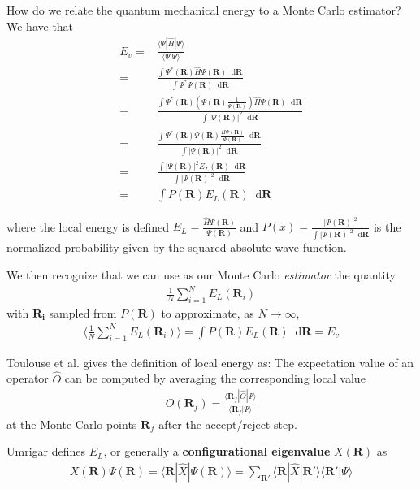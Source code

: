 \documentclass[twoside,english]{uiofysmaster}
\newcommand*\dif{\mathop{}\!\mathrm{d}}
\begin{document}
How do we relate the quantum mechanical energy to a Monte Carlo estimator? We have that \cite{Toulouse2016}
\begin{align}
	E_v =& \frac{\langle \Psi | \hat{H} | \Psi \rangle}{\langle \Psi | \Psi \rangle}  \\
	=& \frac{ \int \Psi^\ast (\bm{R}) \hat{H} \Psi(\bm{R}) \dif \bm{R} }
	{\int \Psi^\ast \Psi(\bm{R}) \dif \bm{R}} \\
	=& \frac{ \int \Psi^\ast (\bm{R}) (\Psi(\bm{R}) \frac{1}{\Psi(\bm{R})}) \hat{H} \Psi(\bm{R}) \dif \bm{R} }
	{\int | \Psi(\bm{R})|^2 \dif \bm{R}} \\
	=&  \frac{ \int \Psi^\ast (\bm{R}) \Psi(\bm{R}) \frac{\hat{H} \Psi(\bm{R}) }{\Psi(\bm{R})}  \dif \bm{R} }
	{\int | \Psi(\bm{R})|^2 \dif \bm{R}} \\
	=&  \frac{ \int | \Psi(\bm{R})|^2  E_L(\bm{R})  \dif \bm{R} }
	{\int | \Psi(\bm{R})|^2 \dif \bm{R}} \\
	=& \int P(\bm{R}) E_L (\bm{R}) \dif \bm{R}
\end{align}

where the local energy is defined $E_L = \frac{\hat{H} \Psi(\bm{R}) }{\Psi(\bm{R})} $ and $P(x) = \frac{| \Psi(\bm{R})|^2 }{ \int | \Psi(\bm{R})|^2 \dif \bm{R} }$ is the normalized probability given by the squared absolute wave function. 

We then recognize that we can use as our Monte Carlo \textit{estimator} the quantity
\begin{align}
	\frac{1}{N} \sum_{i=1}^N E_L(\bm{R}_i)
\end{align}
with $\bm{R_i}$ sampled from $P(\bm{R})$ to approximate, as $N \rightarrow \infty$, 
\begin{align}
	\langle \frac{1}{N} \sum_{i=1}^N E_L(\bm{R}_i) \rangle = \int P(\bm{R}) E_L(\bm{R}) \dif \bm{R} = E_v
\end{align}

Toulouse et al. \cite{Toulouse2016} gives the definition of local energy as: The expectation value of an operator $\hat{O}$ can be computed by averaging the corresponding local value
\begin{align}
	O(\bm{R}_f) = \frac{ \langle \bm{R}_f | \hat{O} |\Psi \rangle }{ \langle \bm{R}_f | \Psi \rangle }
\end{align}
at the Monte Carlo points $\bm{R}_f$ after the accept/reject step.

Umrigar \cite{Umrigar1999} defines $E_L$, or generally a \textbf{configurational eigenvalue} $X (\bm{R})$ as
\begin{align}
	X(\bm{R}) \Psi(\bm{R}) = \langle \bm{R} | \hat{X} | \Psi(\bm{R}) \rangle
	 = \sum_{\bm{R}'} \langle \bm{R} | \hat{X} | \bm{R}' \rangle \langle \bm{R}' | \Psi \rangle
\end{align}
\end{document}
